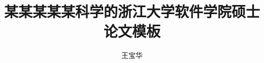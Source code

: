 \documentclass[master,oneside,AutoFakeBold]{zjuthesis} %
\title{某某某某某科学的浙江大学软件学院硕士论文模板} %
\author{王宝华}
\institute{软件学院}         %
\begin{document}
\maketitle

\abstractmatter



\frontmatter
\begin{spacing}{1.2}
       \tableofcontents %
       \listoffigures   %
       \listoftables    %
\end{spacing}

%

\mainmatter



\backmatter



%




\end{document}
